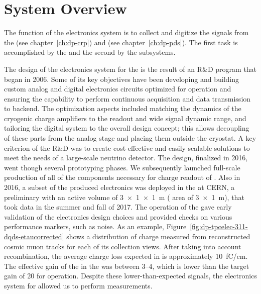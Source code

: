 \section{System Overview}
\label{sec:dp-tpcelec-overview}

The function of the   electronics system is to collect and digitize the signals from the  (see chapter~\ref{ch:dp-crp}) and  (see chapter~\ref{ch:dp-pds}). The first task is accomplished by the  and the second by the  subsystems. 

The design of the electronics system for the   is the result of an R\&D program that began in 2006. Some of its key objectives have been developing and building custom analog and digital electronics circuits optimized for  operation and %
ensuring the capability to perform continuous acquisition and data transmission to  backend. The optimization aspects included matching the dynamics of the cryogenic charge amplifiers to the  readout and wide signal dynamic range, and tailoring the digital  system to the overall  design concept; %
this allows decoupling of these parts from the analog stage and placing them outside the cryostat. A key criterion of the R\&D was to create cost-effective and easily scalable solutions to meet the needs of a large-scale neutrino  detector. The design, finalized in 2016,  went though several prototyping phases. %
We subsequently launched %
full-scale production of all of the components necessary for charge readout of .  %
Also in 2016, a subset of the produced electronics was deployed in the  at CERN, a preliminary \dual \lartpc %
with an active volume  of \SI[product-units=power]{3x1x1}{m} ( area of \SI[product-units=power]{3x1}{m}), that took data in the summer and fall of 2017. The operation of the  \cite{Aimard:2018yxp} gave early validation of the electronics  design choices %
and provided checks on various performance markers, such as noise. As an example, Figure~\ref{fig:dp-tpcelec-311-dqds-etaucorrected} shows a distribution of charge measured from reconstructed cosmic muon tracks for each of its collection views. %
After taking into account recombination, the average  charge loss expected in \lar is approximately \SI{10}{\femto\coulomb/\cm}. The effective gain of the  in the  was between \numrange{3}{4}, which is lower than the target gain of \num{20} for  operation. 
Despite these lower-than-expected %
signals, the electronics system for  allowed us to perform measurements. %

